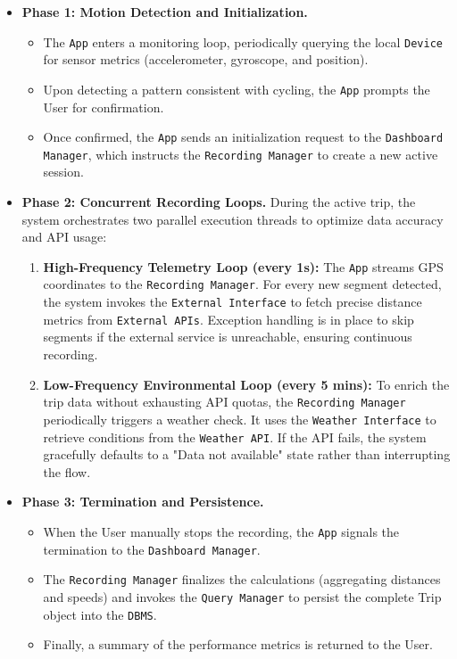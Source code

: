 \begin{itemize}
    \item \textbf{Phase 1: Motion Detection and Initialization.} 
    \begin{itemize}
        \item The \texttt{App} enters a monitoring loop, periodically querying the local \texttt{Device} for sensor metrics (accelerometer, gyroscope, and position).
        \item Upon detecting a pattern consistent with cycling, the \texttt{App} prompts the User for confirmation.
        \item Once confirmed, the \texttt{App} sends an initialization request to the \texttt{Dashboard Manager}, which instructs the \texttt{Recording Manager} to create a new active session.
    \end{itemize}

    \item \textbf{Phase 2: Concurrent Recording Loops.} During the active trip, the system orchestrates two parallel execution threads to optimize data accuracy and API usage:
    \begin{enumerate}
        \item \textbf{High-Frequency Telemetry Loop (every 1s):} The \texttt{App} streams GPS coordinates to the \texttt{Recording Manager}. For every new segment detected, the system invokes the \texttt{External Interface} to fetch precise distance metrics from \texttt{External APIs}. Exception handling is in place to skip segments if the external service is unreachable, ensuring continuous recording.
        \item \textbf{Low-Frequency Environmental Loop (every 5 mins):} To enrich the trip data without exhausting API quotas, the \texttt{Recording Manager} periodically triggers a weather check. It uses the \texttt{Weather Interface} to retrieve conditions from the \texttt{Weather API}. If the API fails, the system gracefully defaults to a "Data not available" state rather than interrupting the flow.
    \end{enumerate}

    \item \textbf{Phase 3: Termination and Persistence.}
    \begin{itemize}
        \item When the User manually stops the recording, the \texttt{App} signals the termination to the \texttt{Dashboard Manager}.
        \item The \texttt{Recording Manager} finalizes the calculations (aggregating distances and speeds) and invokes the \texttt{Query Manager} to persist the complete Trip object into the \texttt{DBMS}.
        \item Finally, a summary of the performance metrics is returned to the User.
    \end{itemize}
\end{itemize}




